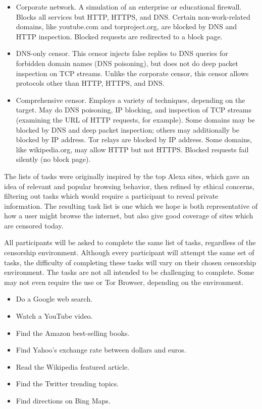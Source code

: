 \documentclass{sig-alternate-hotpets15}
\begin{document}
\begin{itemize} \itemsep1pt \parskip0pt 
\item{Corporate network.}
A simulation of an enterprise or educational firewall.
Blocks all services but HTTP, HTTPS, and DNS.
Certain non-work-related domains, like youtube.com and torproject.org,
are blocked by DNS and HTTP inspection.
Blocked requests are redirected to a block page.
\item{DNS-only censor.}
This censor injects false replies to DNS queries
for forbidden domain names (DNS poisoning),
but does not do deep packet inspection on TCP streams.
Unlike the corporate censor, this censor allows protocols
other than HTTP, HTTPS, and DNS.
\item{Comprehensive censor.}
Employs a variety of techniques, depending on the target.
May do DNS poisoning, IP blocking, and inspection of TCP streams
(examining the URL of HTTP requests, for example).
Some domains may be blocked by DNS and deep packet inspection;
others may additionally be blocked by IP address.
Tor relays are blocked by IP address.
Some domains, like wikipedia.org, may allow HTTP but not HTTPS.
Blocked requests fail silently (no block page).
\end{itemize}

The lists of tasks were originally inspired by the top Alexa sites, which gave an idea of relevant and popular browsing behavior, then refined by ethical concerns, filtering out tasks which would require a participant to reveal private information. The resulting task list is one which we hope is both representative of how a user might browse the internet, but also give good coverage of sites which are censored today. 

All participants will be asked to complete the same list of tasks, regardless of the censorship environment. Although every participant will attempt the same set of tasks, the difficulty of completing these tasks will vary on their chosen censorship environment. The tasks are not all intended to be challenging to complete. Some may not even require the use or Tor Browser, depending on the environment. 

\begin{itemize} \itemsep1pt \parskip0pt 
\item Do a Google web search.
\item Watch a YouTube video.
\item Find the Amazon best-selling books.
\item Find Yahoo's exchange rate between dollars and euros.
\item Read the Wikipedia featured article.
\item Find the Twitter trending topics.
\item Find directions on Bing Maps.
\end{itemize}
\end{document}
